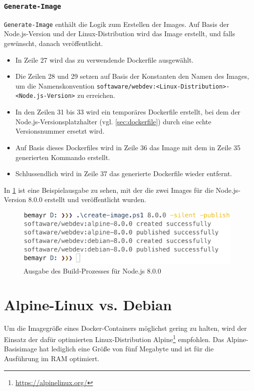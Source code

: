 \subsubsection{\texttt{Generate-Image}}
\verb|Generate-Image| enthält die Logik zum Erstellen der Images.
Auf Basis der Node.js-Version und der Linux-Distribution wird das Image erstellt, und falls gewünscht, danach veröffentlicht.
\begin{itemize}
    \item In Zeile 27 wird das zu verwendende Dockerfile ausgewählt.
    \item Die Zeilen 28 und 29 setzen auf Basis der Konstanten den Namen des Images, um die Namenskonvention \verb|softaware/webdev:<Linux-Distribution>-<Node.js-Version>| zu erreichen.
    \item In den Zeilen 31 bis 33 wird ein temporäres Dockerfile erstellt, bei dem der Node.js-Versionsplatzhalter (vgl. \cref{sec:dockerfile}) durch eine echte Versionsnummer ersetzt wird.
    \item Auf Basis dieses Dockerfiles wird in Zeile 36 das Image mit dem in Zeile 35 generierten Kommando erstellt.
    \item Schlussendlich wird in Zeile 37 das generierte Dockerfile wieder entfernt.
\end{itemize}
In \cref{fig:create-image} ist eine Beispielausgabe zu sehen, mit der die zwei Images für die Node.js-Version 8.0.0 erstellt und veröffentlicht wurden.
\begin{figure}[htbp]
    \centering
    \includegraphics[width=0.75\linewidth,clip]{images/create-image}
    \caption{Ausgabe des Build-Prozesses für Node.js 8.0.0}
\label{fig:create-image}
\end{figure}

\section{Alpine-Linux vs. Debian}
\label{sec:alpine-vs-debian}
Um die Imagegröße eines Docker-Containers möglichst gering zu halten, wird der Einsatz der dafür optimierten Linux-Distribution Alpine\footnote{\url{https://alpinelinux.org/}} empfohlen.
Das Alpine-Basisimage hat lediglich eine Größe von fünf Megabyte und ist für die Ausführung im RAM optimiert.

